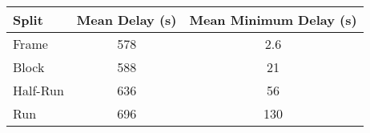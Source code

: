
\begin{tabular}{l*{2}{c}}
\toprule
Split & Mean Delay (s) & Mean Minimum Delay (s) \\
\midrule
Frame & 578 & 2.6 \\
Block & 588 & 21 \\
Half-Run & 636 & 56 \\
Run & 696 & 130 \\
\bottomrule 
\end{tabular}
